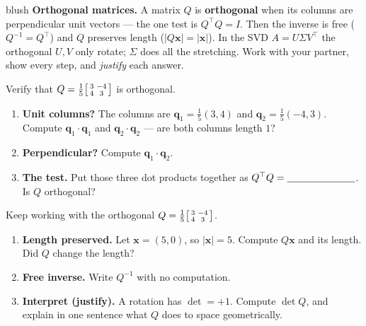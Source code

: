 \documentclass[10pt]{article}
\newcommand{\xx}{\mathbf{x}}
\newcommand{\qq}{\mathbf{q}}
\newcommand{\T}{^{\top}}
\begin{document}
\namepartnerperiod

\vspace{0.10in}

\begin{headlinebox}{blush}
\small\textbf{Orthogonal matrices.} A matrix $Q$ is \textbf{orthogonal} when its columns are perpendicular unit
vectors --- the one test is $Q\T Q=I$. Then the inverse is free ($Q^{-1}=Q\T$) and $Q$ preserves length
($|Q\xx|=|\xx|$). In the SVD $A=U\Sigma V\T$ the orthogonal $U,V$ only rotate; $\Sigma$ does all the stretching.
Work with your partner, show every step, and \emph{justify} each answer.
\end{headlinebox}

\vspace{0.08in}

\begin{tcolorbox}[colback=white, colframe=black!40, title=\textbf{Tier R --- Remediate},
    fonttitle=\bfseries, arc=1.5mm, left=3mm, right=3mm, top=2mm, bottom=2mm, breakable]
Verify that $Q=\tfrac15\begin{bsmallmatrix} 3 & -4\\ 4 & 3 \end{bsmallmatrix}$ is orthogonal.
\begin{enumerate}[leftmargin=1.7em, itemsep=9pt]
  \item \textbf{Unit columns?} The columns are $\qq_1=\tfrac15(3,4)$ and $\qq_2=\tfrac15(-4,3)$. Compute $\qq_1\cdot\qq_1$ and $\qq_2\cdot\qq_2$ --- are both columns length $1$? \writeline
  \item \textbf{Perpendicular?} Compute $\qq_1\cdot\qq_2$. \writeline
  \item \textbf{The test.} Put those three dot products together as $Q\T Q=\blank{2.4cm}$. Is $Q$ orthogonal? \writeline
\end{enumerate}
\end{tcolorbox}

\begin{tcolorbox}[colback=white, colframe=black!40, title=\textbf{Tier A --- Approaching Proficiency},
    fonttitle=\bfseries, arc=1.5mm, left=3mm, right=3mm, top=2mm, bottom=2mm, breakable]
Keep working with the orthogonal $Q=\tfrac15\begin{bsmallmatrix} 3 & -4\\ 4 & 3 \end{bsmallmatrix}$.
\begin{enumerate}[leftmargin=1.7em, itemsep=9pt]
  \item \textbf{Length preserved.} Let $\xx=(5,0)$, so $|\xx|=5$. Compute $Q\xx$ and its length. Did $Q$ change the length? \writeline
  \item \textbf{Free inverse.} Write $Q^{-1}$ with no computation. \blank{3.2cm}
  \item \textbf{Interpret (justify).} A rotation has $\det=+1$. Compute $\det Q$, and explain in one sentence what $Q$ does to space geometrically. \writeline
\end{enumerate}
\end{tcolorbox}
\end{document}
